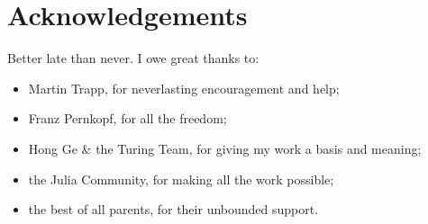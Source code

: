 \chapter*{Acknowledgements}
\label{cha:notation}
\label{acknowledgements}

\noindent Better late than never.  I owe great thanks to:
\begin{itemize}
\item Martin Trapp, for neverlasting encouragement and help;
\item Franz Pernkopf, for all the freedom;
\item Hong Ge \& the Turing Team, for giving my work a basis and meaning; 
\item the Julia Community, for making all the work possible;
\item the best of all parents, for their unbounded support.
\end{itemize}


